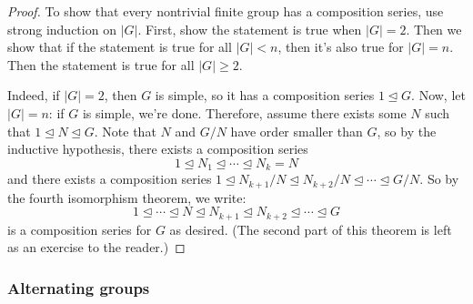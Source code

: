 \documentclass{article}
\theoremstyle{plain}
\begin{document}
\begin{proof}
To show that every nontrivial finite group has a composition series, use strong induction on $|G|$. First, show the statement is true when $|G| = 2$. Then we show that if the statement is true for all $|G| < n$, then it's also true for $|G| = n$. Then the statement is true for all $|G| \ge 2$.

Indeed, if $|G| = 2$, then $G$ is simple, so it has a composition series $1 \trianglelefteq G$. Now, let $|G| = n$: if $G$ is simple, we're done. Therefore, assume there exists some $N$ such that $1 \trianglelefteq N \trianglelefteq G$. Note that $N$ and $G/N$ have order smaller than $G$, so by the inductive hypothesis, there exists a composition series $$1 \trianglelefteq N_1\trianglelefteq \cdots \trianglelefteq N_k = N$$
and there exists a composition series $1 \trianglelefteq N_{k+1}/N \trianglelefteq N_{k+2}/N \trianglelefteq \cdots \trianglelefteq G/N$. So by the fourth isomorphism theorem, we write:
$$1 \trianglelefteq \cdots \trianglelefteq N \trianglelefteq N_{k+1} \trianglelefteq N_{k+2} \trianglelefteq \cdots \trianglelefteq G$$
is a composition series for $G$ as desired. (The second part of this theorem is left as an exercise to the reader.)
\end{proof}

\subsubsection{Alternating groups}
\end{document}
